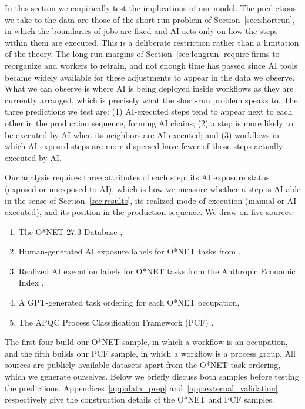 In this section we empirically test the implications of our model.
The predictions we take to the data are those of the short-run problem of Section~\ref{sec:shortrun}, in which the boundaries of jobs are fixed and AI acts only on how the steps within them are executed.
This is a deliberate restriction rather than a limitation of the theory.
The long-run margins of Section~\ref{sec:longrun} require firms to reorganize and workers to retrain, and not enough time has passed since AI tools became widely available for these adjustments to appear in the data we observe.
What we can observe is where AI is being deployed inside workflows as they are currently arranged, which is precisely what the short-run problem speaks to.
The three predictions we test are: 
(1) AI-executed steps tend to appear next to each other in the production sequence, forming AI chains; 
(2) a step is more likely to be executed by AI when its neighbors are AI-executed; and 
(3) workflows in which AI-exposed steps are more dispersed have fewer of those steps actually executed by AI.

Our analysis requires three attributes of each step: its AI exposure status (exposed or unexposed to AI), which is how we measure whether a step is AI-able in the sense of Section~\ref{sec:results}, its realized mode of execution (manual or AI-executed), and its position in the production sequence.
We draw on five sources:
\begin{enumerate}[itemsep=0pt, parsep=0pt]
    \item The O*NET 27.3 Database \citep{onet27_3},
    \item Human-generated AI exposure labels for O*NET tasks from \cite{eloundou2023gpts},
    \item Realized AI execution labels for O*NET tasks from the Anthropic Economic Index \citep{handa2025economictasksperformedai},
    \item A GPT-generated task ordering for each O*NET occupation,
    \item The APQC Process Classification Framework (PCF) \citep{apqc_pcf}.
\end{enumerate}
The first four build our O*NET sample, in which a workflow is an occupation, and the fifth builds our PCF sample, in which a workflow is a process group.
All sources are publicly available datasets apart from the O*NET task ordering, which we generate ourselves.
Below we briefly discuss both samples before testing the predictions. 
Appendices~\ref{app:data_prep} and~\ref{app:external_validation} respectively give the construction details of the O*NET and PCF samples.


